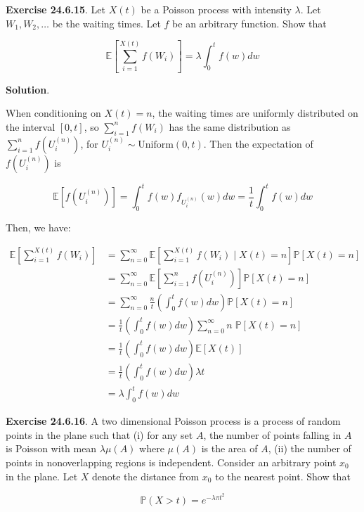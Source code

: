 \textbf{Exercise 24.6.15}. Let \(X(t)\) be a Poisson process with
intensity \(\lambda\). Let \(W_1, W_2, \dots\) be the waiting times. Let
\(f\) be an arbitrary function. Show that

\[ \mathbb{E} \left[ \sum_{i=1}^{X(t)} f(W_i) \right] = \lambda \int_0^t f(w) dw \]

\textbf{Solution}.

When conditioning on \(X(t) = n\), the waiting times are uniformly
distributed on the interval \([0, t]\), so \(\sum_{i=1}^n f(W_i)\) has
the same distribution as \(\sum_{i=1}^n f\left(U_i^{(n)}\right)\), for
\(U_i^{(n)} \sim \text{Uniform}(0, t)\). Then the expectation of
\(f\left(U_i^{(n)}\right)\) is

\[\mathbb{E}\left[ f\left(U_i^{(n)}\right) \right] = \int_0^t f(w) f_{U_i^{(n)}}(w) dw = \frac{1}{t} \int_0^t f(w) dw\]

Then, we have:

\[ 
\begin{align}
\mathbb{E}\left[ \sum_{i=1}^{X(t)} f(W_i) \right] 
&= \sum_{n = 0}^\infty \mathbb{E}\left[ \sum_{i=1}^{X(t)} f(W_i) \; \Bigg| \; X(t) = n\right] \mathbb{P} \left[ X(t) = n \right] \\
&= \sum_{n = 0}^\infty \mathbb{E}\left[ \sum_{i=1}^n f\left(U_i^{(n)}\right) \right] \mathbb{P} \left[ X(t) = n \right] \\
&= \sum_{n = 0}^\infty \frac{n}{t} \left( \int_0^t f(w) dw \right) \mathbb{P} \left[ X(t) = n \right] \\
&= \frac{1}{t} \left( \int_0^t f(w) dw \right) \sum_{n=0}^\infty n \; \mathbb{P} \left[ X(t) = n \right] \\
&= \frac{1}{t} \left( \int_0^t f(w) dw \right) \mathbb{E} \left[ X(t) \right] \\
&= \frac{1}{t} \left( \int_0^t f(w) dw \right) \lambda t \\
&= \lambda \int_0^t f(w) dw
\end{align}
\]

\textbf{Exercise 24.6.16}. A two dimensional Poisson process is a
process of random points in the plane such that (i) for any set \(A\),
the number of points falling in \(A\) is Poisson with mean
\(\lambda \mu(A)\) where \(\mu(A)\) is the area of \(A\), (ii) the
number of points in nonoverlapping regions is independent. Consider an
arbitrary point \(x_0\) in the plane. Let \(X\) denote the distance from
\(x_0\) to the nearest point. Show that

\[ \mathbb{P}(X > t) = e^{-\lambda \pi t^2} \]

